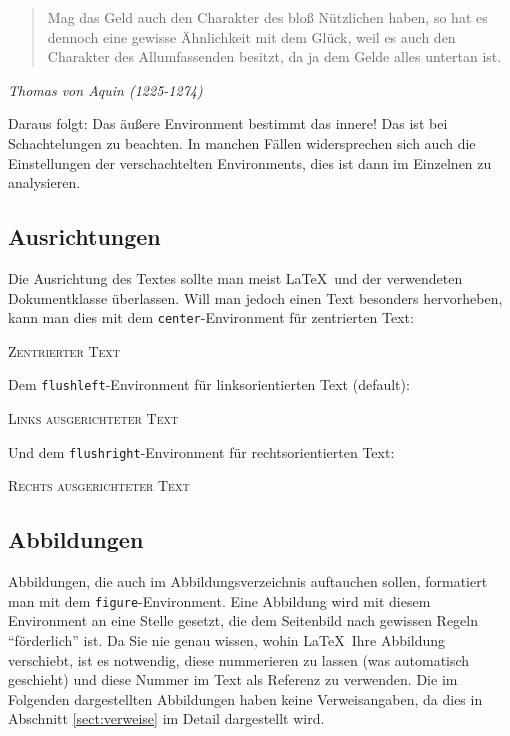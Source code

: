 \begin{quote}
Mag das Geld auch den Charakter des bloß Nützlichen haben, so 
hat es dennoch eine gewisse Ähnlichkeit mit dem Glück, weil es 
auch den Charakter des Allumfassenden besitzt, da ja dem Gelde 
alles untertan ist.
\end{quote}
\begin{flushright}
\textsl{Thomas von Aquin (1225-1274)}
\end{flushright}
Daraus folgt: Das äußere Environment bestimmt das innere! Das ist bei Schachtelungen zu beachten. In manchen Fällen widersprechen sich auch die Einstellungen der verschachtelten Environments, dies ist dann im Einzelnen zu analysieren.

\subsection{Ausrichtungen}

Die Ausrichtung des Textes sollte man meist \LaTeX\ und der verwendeten Dokumentklasse überlassen. Will man jedoch einen Text besonders hervorheben, kann man dies mit dem \texttt{center}-Environment für zentrierten Text:
\begin{center}
\textsc{Zentrierter Text}
\end{center}

\noindent Dem \texttt{flushleft}-Environment für linksorientierten Text (default):

\begin{flushleft}
\textsc{Links ausgerichteter Text}
\end{flushleft}

\noindent Und dem \texttt{flushright}-Environment für rechtsorientierten Text:

\begin{flushright}
\textsc{Rechts ausgerichteter Text}
\end{flushright}

\subsection{Abbildungen}

Abbildungen, die auch im Abbildungsverzeichnis auftauchen sollen, formatiert man mit dem \texttt{figure}-Environment. Eine Abbildung wird mit diesem Environment an eine Stelle gesetzt, die dem Seitenbild nach gewissen Regeln "`förderlich"' ist. Da Sie nie genau wissen, wohin \LaTeX\ Ihre Abbildung verschiebt, ist es notwendig, diese nummerieren zu lassen (was automatisch geschieht) und diese Nummer im Text als Referenz zu verwenden. Die im Folgenden dargestellten Abbildungen haben keine Verweisangaben, da dies in Abschnitt \ref{sect:verweise} im Detail dargestellt wird. 

